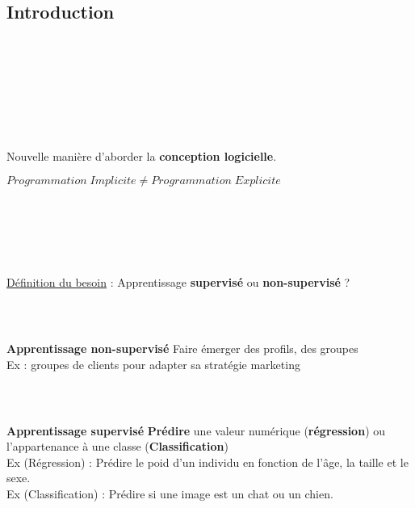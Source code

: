 \subsection{Introduction}

\begin{frame}
  \frametitle{~}
\end{frame}

\begin{frame}
  \frametitle{~}
\end{frame}

\begin{frame}
  \frametitle{~}
  \begin{center}
  Nouvelle manière d'aborder la \textbf{conception logicielle}.
  \end{center}
  \begin{center}
  $\boxed{Programmation\;Implicite \neq Programmation\;Explicite}$
  \end{center}
\end{frame}

\begin{frame}
  \frametitle{~}
\end{frame}

\begin{frame}
  \frametitle{~}
  \underline{Définition du besoin} :
  \newline
  \newline
  Apprentissage \textbf{supervisé} ou \textbf{non-supervisé} ?
\end{frame}

\begin{frame}
  \frametitle{~}
  \textbf{Apprentissage non-supervisé}
  \newline \newline
  Faire émerger des profils, des groupes \\
  \newline
  Ex : groupes de clients pour adapter sa stratégie marketing \\
\end{frame}

\begin{frame}
  \frametitle{~}
  \textbf{Apprentissage supervisé}
  \newline \newline
  \textbf{Prédire} une valeur numérique (\textbf{régression}) ou l'appartenance à une classe (\textbf{Classification}) \\
  \newline
  Ex (Régression)     : Prédire le poid d'un individu en fonction de l'âge, la taille et le sexe. \\
  Ex (Classification) : Prédire si une image est un chat ou un chien. \\
\end{frame}

